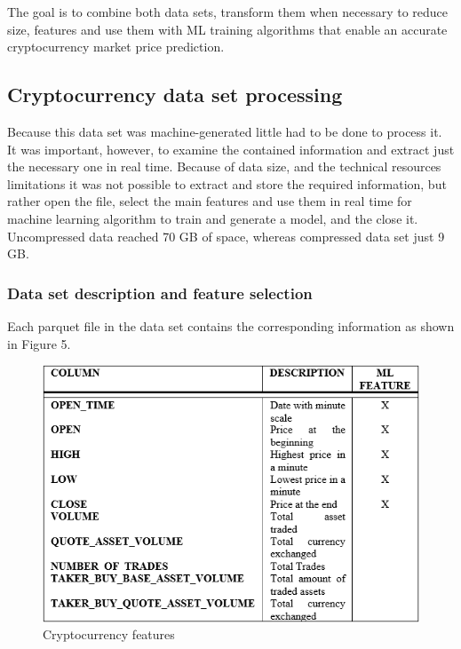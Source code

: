 The goal is to combine both data sets, transform them when necessary to reduce size, features and use them with ML training algorithms that enable an accurate cryptocurrency market price prediction.

\subsection{Cryptocurrency data set processing}

Because this data set was machine-generated little had to be done to process it. It was important, however, to examine the contained information and extract just the necessary one in real time. Because of data size, and the technical resources limitations it was not possible to extract and store the required information, but rather open the file, select the main features and use them in real time for machine learning algorithm to train and generate a model, and the close it. Uncompressed data reached 70 GB of space, whereas compressed data set just 9 GB.

\subsubsection{Data set description and feature selection}
Each parquet file in the data set contains the corresponding information as shown in Figure 5. 


\begin{figure}[H]
   \centering
   \includegraphics[width=\linewidth]{fig/Cryptocurrency features.png}
    \caption{Cryptocurrency features}
    \label{fig:CryptocurrencyFeatures}
\end{figure}

